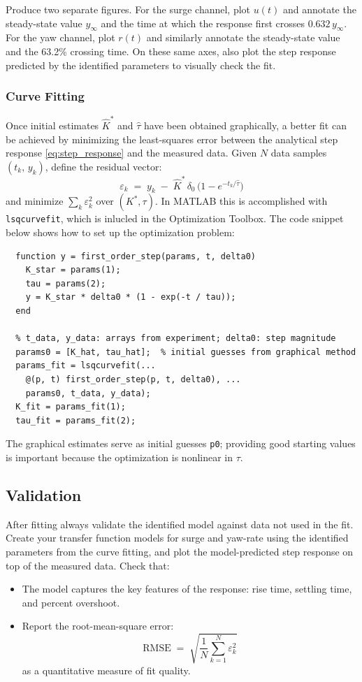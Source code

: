 \documentclass[11pt]{article}
\begin{document}
Produce two separate figures. For the surge channel, plot $u(t)$ and annotate the steady-state value $y_\infty$ and the time at which the response first crosses $0.632\,y_\infty$.  For the yaw channel, plot $r(t)$ and similarly annotate the steady-state value and the 63.2\% crossing time.  On these same axes, also plot the step response predicted by the identified parameters to visually check the fit.

\subsubsection{Curve Fitting}

Once initial estimates $\hat K^*$ and $\hat\tau$ have been obtained
graphically, a better fit can be achieved by minimizing the least-squares
error between the analytical step response \eqref{eq:step_response} and
the measured data.  Given $N$ data samples $(t_k,\,y_k)$, define the
residual vector:
\[
  \varepsilon_k \;=\; y_k \;-\; \hat K^*\,\delta_0\,
  \bigl(1 - e^{-t_k/\hat\tau}\bigr)
\]
and minimize $\sum_k \varepsilon_k^2$ over $(K^*, \tau)$.
In MATLAB this is accomplished with \texttt{lsqcurvefit}, which is inlucled in the Optimization Toolbox.  The code snippet below shows how to set up the optimization problem:

  \begin{verbatim}
  function y = first_order_step(params, t, delta0)
    K_star = params(1);
    tau = params(2);
    y = K_star * delta0 * (1 - exp(-t / tau));
  end

  % t_data, y_data: arrays from experiment; delta0: step magnitude
  params0 = [K_hat, tau_hat];  % initial guesses from graphical method
  params_fit = lsqcurvefit(...
    @(p, t) first_order_step(p, t, delta0), ...
    params0, t_data, y_data);
  K_fit = params_fit(1);
  tau_fit = params_fit(2);
  \end{verbatim}

The graphical estimates serve as initial guesses \texttt{p0}; providing
good starting values is important because the optimization is nonlinear
in $\tau$.

\subsection{Validation}

After fitting always validate the identified model against data not used in the fit.  Create your transfer function models for surge and yaw-rate using the identified parameters from the curve fitting, and plot the model-predicted step response on top of the measured data.  Check that:
\begin{itemize}
  \item The model captures the key features of the response: rise time,
        settling time, and percent overshoot.
  \item Report the root-mean-square error:
        \[
          \mathrm{RMSE} \;=\; \sqrt{\frac{1}{N}\sum_{k=1}^N \varepsilon_k^2}
        \]
        as a quantitative measure of fit quality.
\end{itemize}
\end{document}
